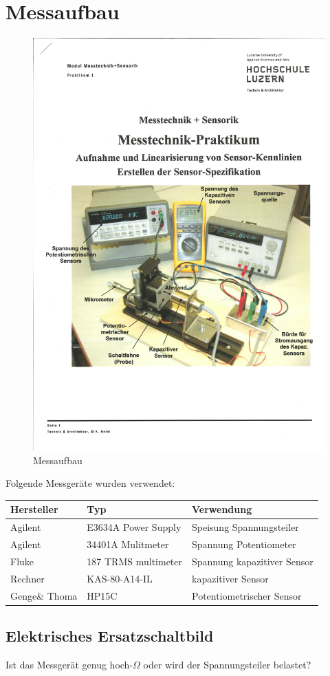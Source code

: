 \section{Messaufbau}


\begin{figure}[H]
    \centering
    \includegraphics[scale=0.8,trim={0.5cm 6cm 0 10.5cm},clip]{pic/aufbau.pdf}
    \caption{Messaufbau}
    \label{fig:messaufbau}
\end{figure}

Folgende Messgeräte wurden verwendet: \\

\begin{tabular}{ l | l | l}
    \hline
    Hersteller & Typ                 & Verwendung                  \\ \hline
    Agilent    & E3634A Power Supply & Speisung Spannungsteiler    \\ \hline
    Agilent    & 34401A Mulitmeter   & Spannung Potentiometer      \\ \hline
    Fluke      & 187 TRMS multimeter & Spannung kapazitiver Sensor \\ \hline
    Rechner    & KAS-80-A14-IL       & kapazitiver Sensor          \\ \hline
    Genge\& Thoma & HP15C               & Potentiometrischer Sensor   \\ \hline
\end{tabular}


\subsection{Elektrisches Ersatzschaltbild}


Ist das Messgerät genug hoch-$\Omega$ oder wird der Spannungsteiler belastet?






\clearpage
